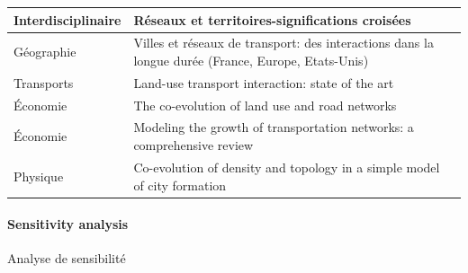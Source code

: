 \begin{table}
{\begin{tabular}{|l|p{6cm}|l|}
	Interdisciplinaire & Réseaux et territoires-significations croisées & \cite{offner1996reseaux} \\\hline
	Géographie & Villes et réseaux de transport: des interactions dans la longue durée (France, Europe, Etats-Unis) & \cite{bretagnolle:tel-00459720} \\\hline
	Transports & Land-use transport interaction: state of the art & \cite{wegener2004land} \\\hline
	Économie & The co-evolution of land use and road networks & \cite{levinson2007co} \\\hline
	Économie & Modeling the growth of transportation networks: a comprehensive review & \cite{xie2009modeling} \\\hline
	Physique & Co-evolution of density and topology in a simple model of city formation & \cite{barthelemy2009co} \\\hline
	\end{tabular}
}
\end{table}




\paragraph{Sensitivity analysis}{Analyse de sensibilité}




